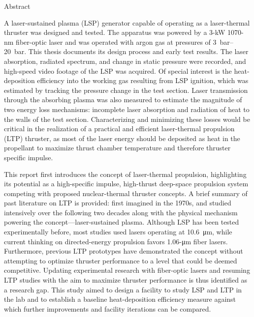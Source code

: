 \begin{plainchp}{Abstract}

    A laser-sustained plasma (LSP) generator capable of operating as a laser-thermal thruster was designed and tested. The apparatus was powered by a \num{3}-\unit{kW} \num{1070}-\unit{nm} fiber-optic laser and was operated with argon gas at pressures of \qtyrange{3}{20}{bar}. This thesis documents its design process and early test results. The laser absorption, radiated spectrum, and change in static pressure were recorded, and high-speed video footage of the LSP was acquired. Of special interest is the heat-deposition efficiency into the working gas resulting from LSP ignition, which was estimated by tracking the pressure change in the test section. Laser transmission through the absorbing plasma was also measured to estimate the magnitude of two energy loss mechanisms: incomplete laser absorption and radiation of heat to the walls of the test section. Characterizing and minimizing these losses would be critical in the realization of a practical and efficient laser-thermal propulsion (LTP) thruster, as most of the laser energy should be deposited as heat in the propellant to maximize thrust chamber temperature and therefore thruster specific impulse.

    This report first introduces the concept of laser-thermal propulsion, highlighting its potential as a high-specific impulse, high-thrust deep-space pro\-pulsion system competing with proposed nuclear-thermal thruster concepts. A brief summary of past literature on LTP is provided: first imagined in the 1970s, and studied intensively over the following two decades along with the physical mechanism powering the concept---laser-sustained plasma. Although LSP has been tested experimentally before, most studies used  lasers operating at \qty{10.6}{\um}, while current thinking on directed-energy pro\-pulsion favors \num{1.06}-\unit{\um} fiber lasers. Furthermore, previous LTP prototypes have demonstrated the concept without attempting to optimize thruster performance to a level that could be deemed competitive. Updating experimental research with fiber-optic lasers and resuming LTP studies with the aim to maximize thruster performance is thus identified as a research gap. This study aimed to design a facility to study LSP and LTP in the lab and to establish a baseline heat-deposition efficiency measure against which further improvements and facility iterations can be compared.


\end{plainchp}

